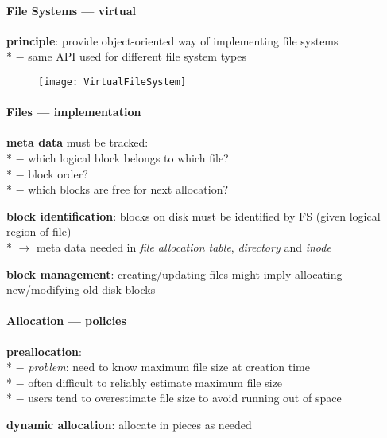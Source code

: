 \paragraph{File Systems --- virtual}
\begin{items}
  \item \textbf{principle}: provide object-oriented way of implementing file systems \\*
    $ - $ same API used for different file system types
\end{items}
\begin{figure}[H]\centering\label{VirtualFileSystem}\texttt{[image: VirtualFileSystem]}\end{figure}

\paragraph{Files --- implementation}
\begin{items}
  \item \textbf{meta data} must be tracked: \\*
    $ - $ which logical block belongs to which file? \\*
    $ - $ block order? \\*
    $ - $ which blocks are free for next allocation?
  \item \textbf{block identification}: blocks on disk must be identified by FS (given logical region of file) \\*
    $ \to $ meta data needed in \emph{file allocation table}, \emph{directory} and \emph{inode}
  \item \textbf{block management}: creating/updating files might imply allocating new/modifying old disk blocks
\end{items}

\paragraph{Allocation --- policies}
\begin{items}
  \item \textbf{preallocation}: \\*
    $ - $ \emph{problem}: need to know maximum file size at creation time \\*
    $ - $ often difficult to reliably estimate maximum file size \\*
    $ - $ users tend to overestimate file size to avoid running out of space
  \item \textbf{dynamic allocation}: allocate in pieces as needed
\end{items}

